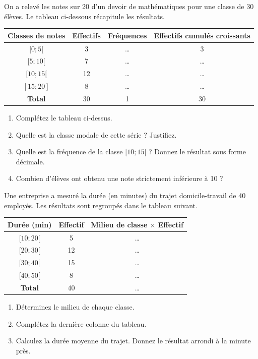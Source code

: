 \documentclass[11pt]{article}
\begin{document}
\begin{exercice}
On a relevé les notes sur 20 d'un devoir de mathématiques pour une classe de 30 élèves. Le tableau ci-dessous récapitule les résultats.

\begin{center}
\begin{tabular}{|c|c|c|c|}
\hline
\textbf{Classes de notes} & \textbf{Effectifs} & \textbf{Fréquences} & \textbf{Effectifs cumulés croissants} \\
\hline
$[0 ; 5[$ & 3 & \ldots & 3 \\
\hline
$[5 ; 10[$ & 7 & \ldots & \ldots \\
\hline
$[10 ; 15[$ & 12 & \ldots & \ldots \\
\hline
$[15 ; 20]$ & 8 & \ldots & \ldots \\
\hline
\textbf{Total} & 30 & 1 & 30 \\
\hline
\end{tabular}
\end{center}

\begin{enumerate}
    \item Complétez le tableau ci-dessus.
    \item Quelle est la classe modale de cette série ? Justifiez.
    \item Quelle est la fréquence de la classe $[10 ; 15[$ ? Donnez le résultat sous forme décimale.
    \item Combien d'élèves ont obtenu une note strictement inférieure à 10 ?
\end{enumerate}
\end{exercice}

\begin{exercice}
Une entreprise a mesuré la durée (en minutes) du trajet domicile-travail de 40 employés. Les résultats sont regroupés dans le tableau suivant.

\begin{center}
\begin{tabular}{|c|c|c|}
\hline
\textbf{Durée (min)} & \textbf{Effectif} & \textbf{Milieu de classe $\times$ Effectif} \\
\hline
$[10 ; 20[$ & 5 & \ldots \\
\hline
$[20 ; 30[$ & 12 & \ldots \\
\hline
$[30 ; 40[$ & 15 & \ldots \\
\hline
$[40 ; 50[$ & 8 & \ldots \\
\hline
\textbf{Total} & 40 & \ldots \\
\hline
\end{tabular}
\end{center}

\begin{enumerate}
    \item Déterminez le milieu de chaque classe.
    \item Complétez la dernière colonne du tableau.
    \item Calculez la durée moyenne du trajet. Donnez le résultat arrondi à la minute près.
\end{enumerate}
\end{exercice}
\end{document}
